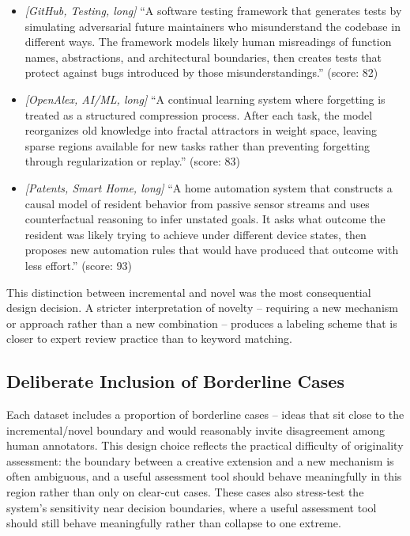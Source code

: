 \begin{itemize}
    \item \textit{[GitHub, Testing, long]} ``A software testing framework that generates tests by simulating adversarial future maintainers who misunderstand the codebase in different ways. The framework models likely human misreadings of function names, abstractions, and architectural boundaries, then creates tests that protect against bugs introduced by those misunderstandings.'' (score: 82)
    \item \textit{[OpenAlex, AI/ML, long]} ``A continual learning system where forgetting is treated as a structured compression process. After each task, the model reorganizes old knowledge into fractal attractors in weight space, leaving sparse regions available for new tasks rather than preventing forgetting through regularization or replay.'' (score: 83)
    \item \textit{[Patents, Smart Home, long]} ``A home automation system that constructs a causal model of resident behavior from passive sensor streams and uses counterfactual reasoning to infer unstated goals. It asks what outcome the resident was likely trying to achieve under different device states, then proposes new automation rules that would have produced that outcome with less effort.'' (score: 93)
\end{itemize}
 
This distinction between incremental and novel was the most consequential design decision. A stricter interpretation of novelty -- requiring a new mechanism or approach rather than a new combination -- produces a labeling scheme that is closer to expert review practice than to keyword matching.
 
\subsection{Deliberate Inclusion of Borderline Cases}
 
Each dataset includes a proportion of borderline cases -- ideas that sit close to the incremental/novel boundary and would reasonably invite disagreement among human annotators. This design choice reflects the practical difficulty of originality assessment: the boundary between a creative extension and a new mechanism is often ambiguous, and a useful assessment tool should behave meaningfully in this region rather than only on clear-cut cases. These cases also stress-test the system's sensitivity near decision boundaries, where a useful assessment tool should still behave meaningfully rather than collapse to one extreme.
 
